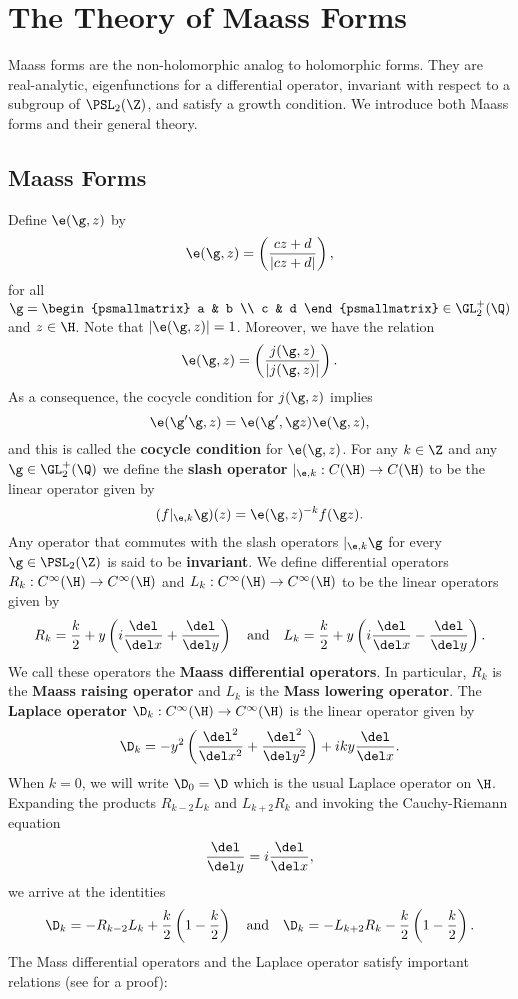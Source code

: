 \chapter{The Theory of Maass Forms}
	Maass forms are the non-holomorphic analog to holomorphic forms. They are real-analytic, eigenfunctions for a differential operator, invariant with respect to a subgroup of $\PSL_{2}(\Z)$, and satisfy a growth condition. We introduce both Maass forms and their general theory.
  \section{Maass Forms}
    Define $\e(\g,z)$ by
    \[
      \e(\g,z) = \left(\frac{cz+d}{|cz+d|}\right),
    \]
    for all $\g = \begin{psmallmatrix} a & b \\ c & d \end{psmallmatrix} \in \GL_{2}^{+}(\Q)$ and $z \in \H$. Note that $|\e(\g,z)| = 1$. Moreover, we have the relation
    \[
      \e(\g,z) = \left(\frac{j(\g,z)}{|j(\g,z)|}\right).
    \]
    As a consequence, the cocycle condition for $j(\g,z)$ implies
    \[
      \e(\g'\g,z) =  \e(\g',\g z)\e(\g,z),
    \]
    and this is called the \textbf{cocycle condition} for $\e(\g,z)$. For any $k \in \Z$ and any $\g \in \GL_{2}^{+}(\Q)$ we define the \textbf{slash operator} $|_{\e,k}:C(\H) \to C(\H)$ to be the linear operator given by
    \[
      (f|_{\e,k}\g)(z) = \e(\g,z)^{-k}f(\g z).
    \]
    Any operator that commutes with the slash operators $|_{\e,k}\g$ for every $\g \in \PSL_{2}(\Z)$ is said to be \textbf{invariant}. We define differential operators $R_{k}:C^{\infty}(\H) \to C^{\infty}(\H)$ and $L_{k}:C^{\infty}(\H) \to C^{\infty}(\H)$ to be the linear operators given by
    \begin{align*}
      R_{k} = \frac{k}{2}+y\left(i\frac{\del}{\del x}+\frac{\del}{\del y}\right) \quad \text{and} \quad L_{k} = \frac{k}{2}+y\left(i\frac{\del}{\del x}-\frac{\del}{\del y}\right).
    \end{align*}
    We call these operators the \textbf{Maass differential operators}. In particular, $R_{k}$ is the \textbf{Maass raising operator} and $L_{k}$ is the \textbf{Mass lowering operator}. The \textbf{Laplace operator} $\D_{k}:C^{\infty}(\H) \to C^{\infty}(\H)$ is the linear operator given by
    \[
      \D_{k} = -y^{2}\left(\frac{\del^{2}}{\del x^{2}}+\frac{\del^{2}}{\del y^{2}}\right)+iky\frac{\del}{\del x}.
    \]
    When $k = 0$, we will write $\D_{0} = \D$ which is the usual Laplace operator on $\H$. Expanding the products $R_{k-2}L_{k}$ and $L_{k+2}R_{k}$ and invoking the Cauchy-Riemann equation
    \[
      \frac{\del}{\del y} = i\frac{\del}{\del x},
    \]
    we arrive at the identities
    \[
      \D_{k} = -R_{k-2}L_{k}+\frac{k}{2}\left(1-\frac{k}{2}\right) \quad \text{and} \quad \D_{k} = -L_{k+2}R_{k}-\frac{k}{2}\left(1-\frac{k}{2}\right).
    \]
     The Mass differential operators and the Laplace operator satisfy important relations (see \cite{bumpautomorphic1997} for a proof):

